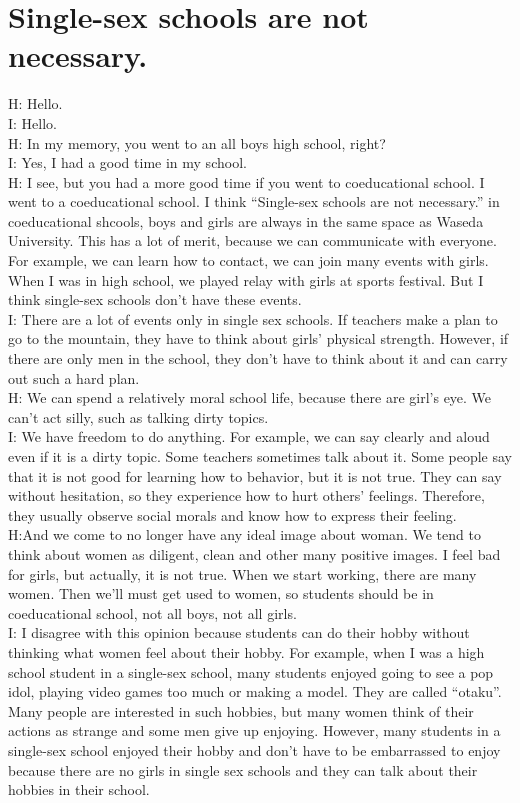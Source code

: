 \documentclass[11pt]{jsarticle}
\begin{document}
\section{Single-sex schools are not necessary.}
\noindent
H: Hello.\\
I: Hello.\\
H: In my memory, you went to an all boys high school, right?\\
I: Yes, I had a good time in my school.\\
H: I see, but you had a more good time if you went to coeducational school.
I went to a coeducational school. I think ``Single-sex schools are not necessary.''
in coeducational shcools, boys and girls are always in the same space as Waseda University.
This has a lot of merit, because we can communicate with everyone.
For example, we can learn how to contact, we can join many events with girls.
When I was in high school, we played relay with girls at sports festival.
But I think single-sex schools don't have these events. \\
%
I: There are a lot of events only in single sex schools. If teachers make a plan to go to the mountain,
they have to think about girls’ physical strength.
However, if there are only men in the school, they don’t have to think about it and can carry out such a hard plan.\\
H: We can spend a relatively moral school life, because there are girl's eye.
We can't act silly, such as talking dirty topics.\\
%
I: We have freedom to do anything. For example, we can say clearly and aloud even if it is a dirty topic.
Some teachers sometimes talk about it. Some people say that it is not good for learning how to behavior, but it is not true.
They can say without hesitation, so they experience how to hurt others’ feelings.
Therefore, they usually observe social morals and know how to express their feeling.\\
H:And we come to no longer have any ideal image about woman.
We tend to think about women as diligent, clean and other many positive images.
I feel bad for girls, but actually, it is not true.
When we start working, there are many women.
Then we'll must get used to women, so students should be in coeducational school, not all boys, not all girls.\\
I: I disagree with this opinion because students can do their hobby without thinking what women feel about their hobby.
For example, when I was a high school student in a single-sex school,
many students enjoyed going to see a pop idol, playing video games too much or making a model.
They are called “otaku”. 
Many people are interested in such hobbies, but many women think of their actions as strange and some men give up enjoying.
However, many students in a single-sex school enjoyed their hobby and don’t have to be embarrassed to enjoy
because there are no girls in single sex schools and they can talk about their hobbies in their school.
\end{document}

